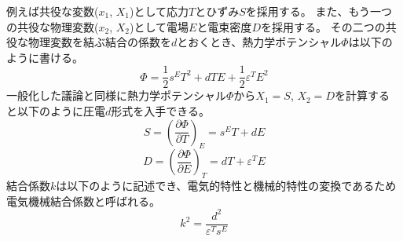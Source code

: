 \documentclass[dvipdfmx,12pt,a4paper]{jreport}
\begin{document}
			例えば共役な変数($x_1$, $X_1$)として応力$T$とひずみ$S$を採用する。
			また、もう一つの共役な物理変数($x_2$, $X_2$)として電場$E$と電束密度$D$を採用する。
			その二つの共役な物理変数を結ぶ結合の係数を$d$とおくとき、熱力学ポテンシャル$\Phi$は以下のように書ける。
			\begin{equation}
				\Phi = \frac{1}{2}s^ET^2 + d T E + \frac{1}{2}\varepsilon^T E^2
			\end{equation}
			一般化した議論と同様に熱力学ポテンシャル$\Phi$から$X_1=S$, $X_2=D$を計算する
			と以下のように圧電$d$形式を入手できる。
			\begin{equation}
				S = \left(\frac{\partial \Phi}{\partial T} \right)_E = s^E T + d E
			\end{equation}
			\begin{equation}
				D=\left(\frac{\partial \Phi}{\partial E}\right)_T = dT+\varepsilon^T E
			\end{equation}
			結合係数$k$は以下のように記述でき、電気的特性と機械的特性の変換であるため電気機械結合係数と呼ばれる。
			\begin{equation}
				k^2 = \frac{d^2}{\varepsilon^Ts^E}
				\label{電気機械結合係数d}
			\end{equation}
\end{document}
